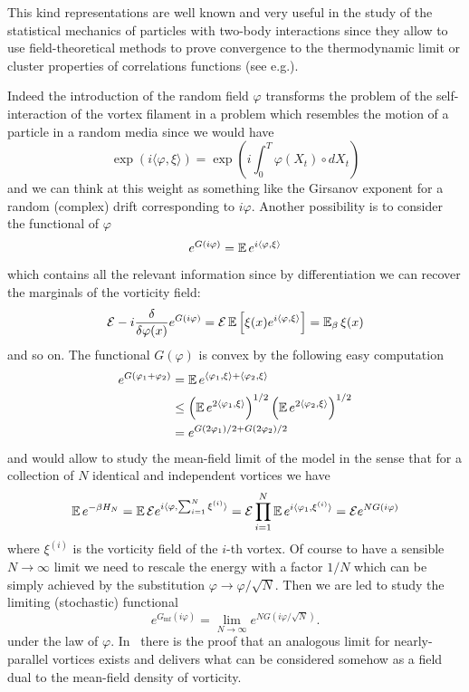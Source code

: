 This kind representations are well known and very useful in the study of the
statistical mechanics of particles with two-body interactions since they
allow to use field-theoretical methods to prove convergence to the
thermodynamic limit or cluster properties of correlations functions
(see e.g.\cite{Simon}).  

Indeed the introduction of the random field $\varphi$ transforms the
problem of the self-interaction of the vortex filament in a problem
which resembles the motion of a particle in a random media since we
would have
$$
\exp\left({i \langle \varphi, \xi \rangle}\right) = 
\exp\left({i \int_0^T \varphi(X_t) \circ dX_t}\right)
$$ 
and we can think at this weight as something like the Girsanov exponent
for a random (complex) drift corresponding to $i\varphi$. Another
possibility is to consider the functional of $\varphi$
$$
e^{G(i \varphi)} = \operatorname{{\mathbb E}} e^{i \langle \varphi, \xi \rangle } 
$$
which contains all the relevant information since by
differentiation we can recover the marginals of the vorticity field:
$$
\mathcal{E} -i \frac{\delta }{\delta \varphi(x)} e^{G(i \varphi)} =
\mathcal{E} \operatorname{{\mathbb E}} \left[ \xi(x) e^{i \langle \varphi, \xi \rangle} \right]
= \operatorname{{\mathbb E}}_\beta  \xi(x) 
$$
and so on.
The functional $G(\varphi)$ is convex by the following easy
computation
\begin{equation*}
\begin{split}
e^{G(\varphi_1+\varphi_2)} & = \operatorname{{\mathbb E}} e^{ \langle \varphi_1, \xi
  \rangle +  \langle \varphi_2, \xi \rangle } \\ & \le 
\left( \operatorname{{\mathbb E}} e^{2  \langle \varphi_1, \xi \rangle}\right)^{1/2} 
\left( \operatorname{{\mathbb E}} e^{2  \langle \varphi_2, \xi \rangle}\right)^{1/2} 
\\ & = e^{G(2\varphi_1)/2+G(2\varphi_2)/2}
\end{split}
\end{equation*}
and would allow to study the mean-field limit of the model in the
sense that for a collection of $N$ identical and independent vortices
we have
$$
\operatorname{{\mathbb E}} e^{-\beta H_N} = \operatorname{{\mathbb E}} \mathcal{E} e^{i \langle \varphi, \sum_{i=1}^N \xi^{(i)}
  \rangle} = \mathcal{E}  \prod_{i=1}^N \operatorname{{\mathbb E}} e^{i \langle \varphi_1, 
  \xi^{(i)} \rangle} = \mathcal{E} e^{N G(i \varphi)}
$$  
where $\xi^{(i)}$ is the vorticity field of the $i$-th vortex. Of
course to have a sensible $N \to \infty$ limit we need to rescale the
energy with a factor $1/N$ which can be simply achieved by the substitution
$\varphi \to \varphi/\sqrt{N}$. Then we are led to study the limiting
(stochastic) functional
$$
e^{G_{\text{mf}}(i \varphi)} = \lim_{N \to \infty} e^{N G(i \varphi / \sqrt{N})}.
$$
under the law of $\varphi$.
In~\cite{PLL - M} there is the proof that an analogous limit for
nearly-parallel vortices exists and delivers what can
be considered somehow as a field dual to the mean-field density of vorticity.     

